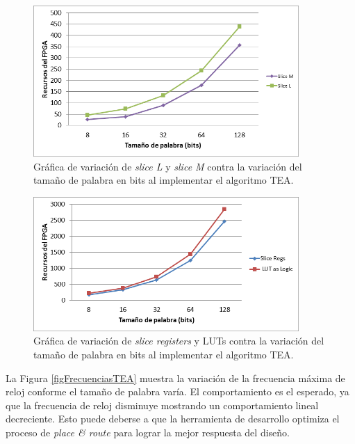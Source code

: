 \begin{figure}[H]
	\centering
	\includegraphics[width=0.9\textwidth]{./images/figSlicesTEA}
	\caption{Gráfica de variación de \textit{slice L} y \textit{slice M} contra la variación del tamaño de palabra en bits al implementar el algoritmo TEA.}
	\label{figSlicesTEA}
\end{figure}
\begin{figure}[H]
	\centering
	\includegraphics[width=0.9\textwidth]{./images/figSliceRegsLutsTEA}
	\caption{Gráfica de variación de \textit{slice registers} y LUTs contra la variación del tamaño de palabra en bits al implementar el algoritmo TEA.}
	\label{figSliceRegsLutsTEA}
\end{figure}

La Figura \ref{figFrecuenciasTEA} muestra la variación de la frecuencia máxima de reloj conforme el tamaño de palabra varía. El comportamiento es el esperado, ya que la frecuencia de reloj disminuye mostrando un comportamiento lineal decreciente. Esto puede deberse a que la herramienta de desarrollo optimiza el proceso de \textit{place \& route} para lograr la mejor respuesta del diseño.

